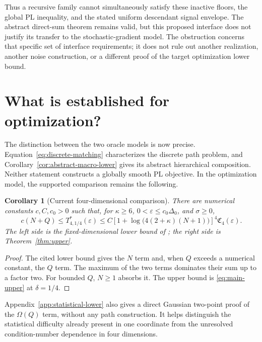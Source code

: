 \documentclass[11pt,a4paper]{article}
\newcommand{\eps}{\varepsilon}
\newcommand{\profile}{\mathfrak C_4}
\newtheorem{corollary}[theorem]{Corollary}
\theoremstyle{definition}
\theoremstyle{remark}
\begin{document}
Thus a recursive family cannot simultaneously satisfy these inactive floors,
the global PL inequality, and the stated uniform descendant signal envelope.
The abstract direct-sum theorem remains valid, but this proposed interface
does not justify its transfer to the stochastic-gradient model.  The
obstruction concerns that specific set of interface requirements; it does
not rule out another realization, another noise construction, or a different
proof of the target optimization lower bound.


\section{What is established for optimization?}
\label{sec:status}

The distinction between the two oracle models is now precise.
Equation~\eqref{eq:discrete-matching} characterizes the discrete
path problem, and Corollary~\ref{cor:abstract-macro-lower} gives
its abstract hierarchical composition.  Neither statement
constructs a globally smooth PL objective.  In the optimization
model, the supported comparison remains the following.

\begin{corollary}[Current four-dimensional comparison]
\label{cor:optimization-comparison}
There are numerical constants $c,C,c_0>0$ such that, for
$\kappa\ge6$, $0<\eps\le c_0\Delta_0$, and $\sigma\ge0$,
\begin{equation}
 c(N+Q)\le T^*_{4,1/4}(\eps)
 \le C\left[1+\log\bigl(4(2+\kappa)(N+1)\bigr)\right]^4
        \profile(\eps).
 \label{eq:remaining-gap}
\end{equation}
The left side is the fixed-dimensional lower bound of
\cite[Theorem 5.1]{ouwang2026}; the right side is
Theorem~\ref{thm:upper}.
\end{corollary}

\begin{proof}
The cited lower bound gives the $N$ term and, when $Q$ exceeds a
numerical constant, the $Q$ term.  The maximum of the two terms
dominates their sum up to a factor two.  For bounded $Q$,
$N\ge1$ absorbs it.  The upper bound is
\eqref{eq:main-upper} at $\delta=1/4$.
\end{proof}

Appendix~\ref{app:statistical-lower} also gives a direct Gaussian
two-point proof of the $\Omega(Q)$ term, without any path
construction.  It helps distinguish the statistical difficulty
already present in one coordinate from the unresolved
condition-number dependence in four dimensions.
\end{document}
